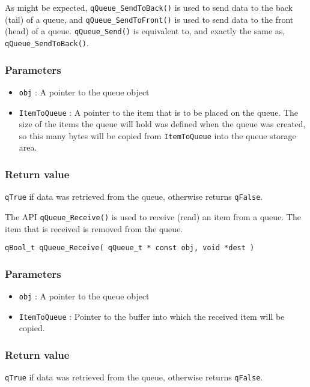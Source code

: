 As might be expected, \lstinline{qQueue_SendToBack()} is used to send data to the back (tail) of a queue, and \lstinline{qQueue_SendToFront()} is used to send data to the front (head) of a queue. \lstinline{qQueue_Send()}  is equivalent to, and exactly the same as, \lstinline{qQueue_SendToBack()}.

\subsubsection*{Parameters}
\begin{itemize}
    \item \lstinline{obj} : A pointer to the queue object
    \item \lstinline{ItemToQueue} : A pointer to the item that is to be placed on the queue. The size of the items the queue will hold was defined when the queue was created, so this many bytes will be copied from \lstinline{ItemToQueue} into the queue storage area. 
\end{itemize}  

\subsubsection*{Return value}
\lstinline{qTrue} if data was retrieved from the queue, otherwise returns \lstinline{qFalse}.

\noindent\hrulefill  

The API \lstinline{qQueue_Receive()}  is used to receive (read) an item from a queue. The item that is received is removed from the queue. 
\medskip

\begin{lstlisting}[style=CStyle]
qBool_t qQueue_Receive( qQueue_t * const obj, void *dest )
\end{lstlisting}

\subsubsection*{Parameters}
\begin{itemize}
    \item \lstinline{obj} : A pointer to the queue object
    \item \lstinline{ItemToQueue} : Pointer to the buffer into which the received item will be copied.
\end{itemize}  

\subsubsection*{Return value}
\lstinline{qTrue} if data was retrieved from the queue, otherwise returns \lstinline{qFalse}.

